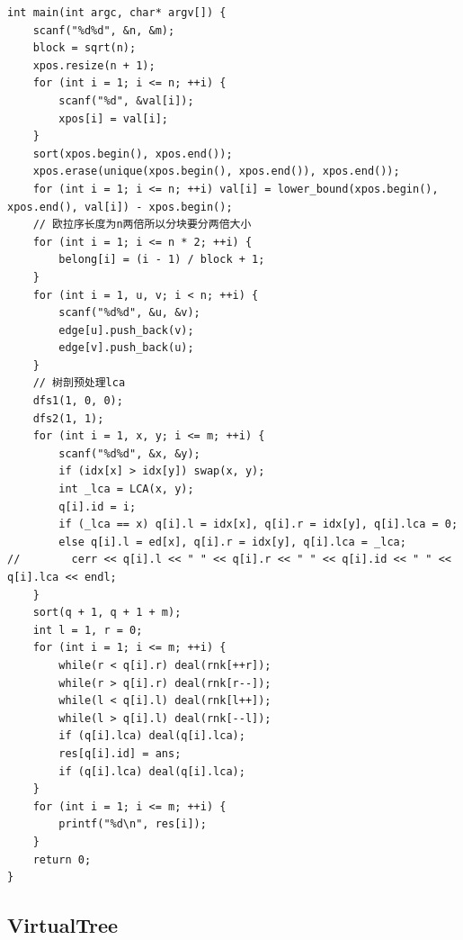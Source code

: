 \documentclass[twoside]{article}
\begin{document}
\begin{lstlisting}
int main(int argc, char* argv[]) {
    scanf("%d%d", &n, &m);
    block = sqrt(n);
    xpos.resize(n + 1);
    for (int i = 1; i <= n; ++i) {
        scanf("%d", &val[i]);
        xpos[i] = val[i];
    }
    sort(xpos.begin(), xpos.end());
    xpos.erase(unique(xpos.begin(), xpos.end()), xpos.end());
    for (int i = 1; i <= n; ++i) val[i] = lower_bound(xpos.begin(), xpos.end(), val[i]) - xpos.begin();
    // 欧拉序长度为n两倍所以分块要分两倍大小
    for (int i = 1; i <= n * 2; ++i) {
        belong[i] = (i - 1) / block + 1;
    }
    for (int i = 1, u, v; i < n; ++i) {
        scanf("%d%d", &u, &v);
        edge[u].push_back(v);
        edge[v].push_back(u);
    }
    // 树剖预处理lca
    dfs1(1, 0, 0);
    dfs2(1, 1);
    for (int i = 1, x, y; i <= m; ++i) {
        scanf("%d%d", &x, &y);
        if (idx[x] > idx[y]) swap(x, y);
        int _lca = LCA(x, y);
        q[i].id = i;
        if (_lca == x) q[i].l = idx[x], q[i].r = idx[y], q[i].lca = 0;
        else q[i].l = ed[x], q[i].r = idx[y], q[i].lca = _lca;
//        cerr << q[i].l << " " << q[i].r << " " << q[i].id << " " << q[i].lca << endl;
    }
    sort(q + 1, q + 1 + m);
    int l = 1, r = 0;
    for (int i = 1; i <= m; ++i) {
        while(r < q[i].r) deal(rnk[++r]);
        while(r > q[i].r) deal(rnk[r--]);
        while(l < q[i].l) deal(rnk[l++]);
        while(l > q[i].l) deal(rnk[--l]);
        if (q[i].lca) deal(q[i].lca);
        res[q[i].id] = ans;
        if (q[i].lca) deal(q[i].lca);
    }
    for (int i = 1; i <= m; ++i) {
        printf("%d\n", res[i]);
    }
    return 0;
}\end{lstlisting}
\subsection{VirtualTree}
\end{document}
